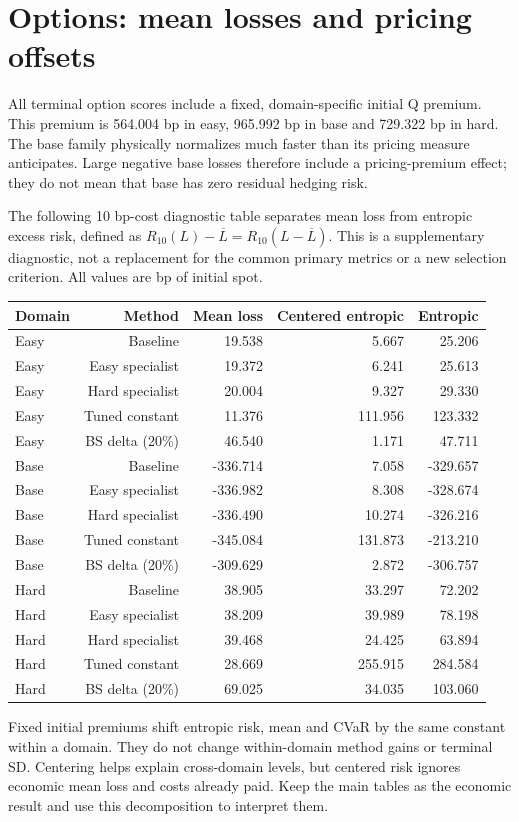 \documentclass[11pt,a4paper]{article}
\begin{document}
\section{Options: mean losses and pricing offsets}
All terminal option scores include a fixed, domain-specific initial Q premium. This premium is 564.004 bp in easy, 965.992 bp in base and 729.322 bp in hard. The base family physically normalizes much faster than its pricing measure anticipates. Large negative base losses therefore include a pricing-premium effect; they do not mean that base has zero residual hedging risk.

The following 10 bp-cost diagnostic table separates mean loss from entropic excess risk, defined as \(R_{10}(L)-\overline L=R_{10}(L-\overline L)\). This is a supplementary diagnostic, not a replacement for the common primary metrics or a new selection criterion. All values are bp of initial spot.
\begin{small}
\begin{tabular}{lrrrr}
\toprule
Domain & Method & Mean loss & Centered entropic & Entropic \\
\midrule
Easy & Baseline & 19.538 & 5.667 & 25.206 \\
Easy & Easy specialist & 19.372 & 6.241 & 25.613 \\
Easy & Hard specialist & 20.004 & 9.327 & 29.330 \\
Easy & Tuned constant & 11.376 & 111.956 & 123.332 \\
Easy & BS delta (20\%) & 46.540 & 1.171 & 47.711 \\
Base & Baseline & -336.714 & 7.058 & -329.657 \\
Base & Easy specialist & -336.982 & 8.308 & -328.674 \\
Base & Hard specialist & -336.490 & 10.274 & -326.216 \\
Base & Tuned constant & -345.084 & 131.873 & -213.210 \\
Base & BS delta (20\%) & -309.629 & 2.872 & -306.757 \\
Hard & Baseline & 38.905 & 33.297 & 72.202 \\
Hard & Easy specialist & 38.209 & 39.989 & 78.198 \\
Hard & Hard specialist & 39.468 & 24.425 & 63.894 \\
Hard & Tuned constant & 28.669 & 255.915 & 284.584 \\
Hard & BS delta (20\%) & 69.025 & 34.035 & 103.060 \\
\bottomrule
\end{tabular}
\end{small}\par\medskip
Fixed initial premiums shift entropic risk, mean and CVaR by the same constant within a domain. They do not change within-domain method gains or terminal SD. Centering helps explain cross-domain levels, but centered risk ignores economic mean loss and costs already paid. Keep the main tables as the economic result and use this decomposition to interpret them.
\end{document}
